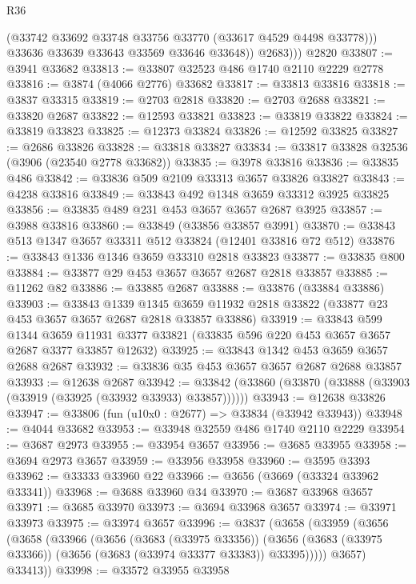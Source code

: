 \begin{lexlean}{R36}
\begin{coremodule}
              (@33742 @33692 @33748 @33756 @33770 (@33617 @4529 @4498 @33778)))
            @33636
            @33639
            @33643
            @33569
            @33646
            @33648))
          @2683)))
    @2820
@33807 := @3941 @33682
@33813 := @33807 @32523 @486 @1740 @2110 @2229 @2778
@33816 := @3874 (@4066 @2776) @33682
@33817 := @33813 @33816
@33818 := @3837 @33315
@33819 := @2703 @2818
@33820 := @2703 @2688
@33821 := @33820 @2687
@33822 := @12593 @33821
@33823 := @33819 @33822
@33824 := @33819 @33823
@33825 := @12373 @33824
@33826 := @12592 @33825
@33827 := @2686 @33826
@33828 := @33818 @33827
@33834 := @33817 @33828 @32536 (@3906 (@23540 @2778 @33682))
@33835 := @3978 @33816
@33836 := @33835 @486
@33842 := @33836 @509 @2109 @33313 @3657 @33826 @33827
@33843 := @4238 @33816
@33849 := @33843 @492 @1348 @3659 @33312 @3925 @33825
@33856 := @33835 @489 @231 @453 @3657 @3657 @2687 @3925
@33857 := @3988 @33816
@33860 := @33849 (@33856 @33857 @3991)
@33870 := @33843 @513 @1347 @3657 @33311 @512 @33824 (@12401 @33816 @72 @512)
@33876 := @33843 @1336 @1346 @3659 @33310 @2818 @33823
@33877 := @33835 @800
@33884 := @33877 @29 @453 @3657 @3657 @2687 @2818 @33857
@33885 := @11262 @82
@33886 := @33885 @2687
@33888 := @33876 (@33884 @33886)
@33903 := @33843
    @1339
    @1345
    @3659
    @11932
    @2818
    @33822
    (@33877 @23 @453 @3657 @3657 @2687 @2818 @33857 @33886)
@33919 := @33843
    @599
    @1344
    @3659
    @11931
    @3377
    @33821
    (@33835 @596 @220 @453 @3657 @3657 @2687 @3377 @33857 @12632)
@33925 := @33843 @1342 @453 @3659 @3657 @2688 @2687
@33932 := @33836 @35 @453 @3657 @3657 @2687 @2688 @33857
@33933 := @12638 @2687
@33942 := @33842 (@33860 (@33870 (@33888 (@33903 (@33919 (@33925 (@33932 @33933) @33857))))))
@33943 := @12638 @33826
@33947 := @33806 (fun (u10x0 : @2677) => @33834 (@33942 @33943))
@33948 := @4044 @33682
@33953 := @33948 @32559 @486 @1740 @2110 @2229
@33954 := @3687 @2973
@33955 := @33954 @3657
@33956 := @3685 @33955
@33958 := @3694 @2973 @3657
@33959 := @33956 @33958
@33960 := @3595 @3393
@33962 := @33333 @33960 @22
@33966 := @3656 (@3669 (@33324 @33962 @33341))
@33968 := @3688 @33960 @34
@33970 := @3687 @33968 @3657
@33971 := @3685 @33970
@33973 := @3694 @33968 @3657
@33974 := @33971 @33973
@33975 := @33974 @3657
@33996 := @3837
    (@3658
      (@33959
        (@3656
          (@3658
            (@33966
              (@3656
                (@3683 (@33975 @33356))
                (@3656 (@3683 (@33975 @33366)) (@3656 (@3683 (@33974 @33377 @33383)) @33395)))))
          @3657)
        @33413))
@33998 := @33572 @33955 @33958

\end{coremodule}
\end{lexlean}

